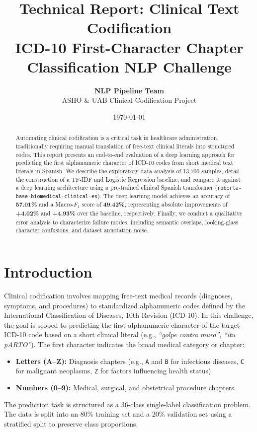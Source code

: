 \documentclass[11pt,a4paper]{article}
\title{
    \vspace{-2cm}
    \textbf{\color{clinicalblue}Technical Report: Clinical Text Codification}\\
    \large{ICD-10 First-Character Chapter Classification NLP Challenge}
}
\author{\textbf{NLP Pipeline Team} \\ ASHO \& UAB Clinical Codification Project}
\date{\today}
\begin{document}
\maketitle

\begin{abstract}
Automating clinical codification is a critical task in healthcare administration, traditionally requiring manual translation of free-text clinical literals into structured codes. This report presents an end-to-end evaluation of a deep learning approach for predicting the first alphanumeric character of ICD-10 codes from short medical text literals in Spanish. We describe the exploratory data analysis of 13,700 samples, detail the construction of a TF-IDF and Logistic Regression baseline, and compare it against a deep learning architecture using a pre-trained clinical Spanish transformer (\texttt{roberta-base-biomedical-clinical-es}). The deep learning model achieves an accuracy of \textbf{57.01\%} and a Macro-$F_1$ score of \textbf{49.42\%}, representing absolute improvements of \textbf{+4.02\%} and \textbf{+4.93\%} over the baseline, respectively. Finally, we conduct a qualitative error analysis to characterize failure modes, including semantic overlaps, looking-glass character confusions, and dataset annotation noise.
\end{abstract}

\section{Introduction}
Clinical codification involves mapping free-text medical records (diagnoses, symptoms, and procedures) to standardized alphanumeric codes defined by the International Classification of Diseases, 10th Revision (ICD-10). In this challenge, the goal is scoped to predicting the first alphanumeric character of the target ICD-10 code based on a short clinical literal (e.g., \textit{``golpe contra muro''}, \textit{``itu pARTO''}). The first character indicates the broad medical category or chapter:
\begin{itemize}
    \item \textbf{Letters (A--Z):} Diagnosis chapters (e.g., \texttt{A} and \texttt{B} for infectious diseases, \texttt{C} for malignant neoplasms, \texttt{Z} for factors influencing health status).
    \item \textbf{Numbers (0--9):} Medical, surgical, and obstetrical procedure chapters.
\end{itemize}
The prediction task is structured as a 36-class single-label classification problem. The data is split into an 80\% training set and a 20\% validation set using a stratified split to preserve class proportions.
\end{document}
